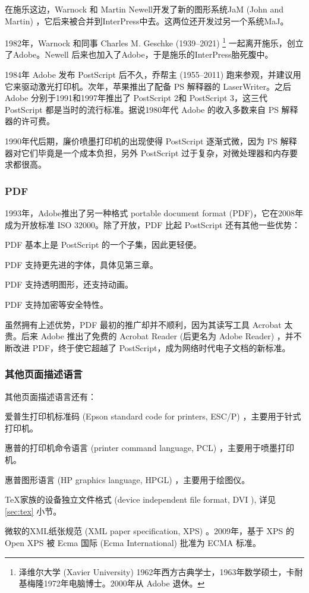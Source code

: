 在施乐这边，Warnock 和 Martin Newell\indexNewell 开发了新的图形系统JaM (John and Martin) ，它后来被合并到InterPress中去。这两位还开发过另一个系统MaJ。

1982年，Warnock 和同事 Charles M. Geschke (1939--2021)\indexGeschke{} \footnote{泽维尔大学 (Xavier University) 1962年西方古典学士，1963年数学硕士，卡耐基梅隆1972年电脑博士。2000年从 Adobe 退休。} 一起离开施乐，创立了Adobe\indexAdobe{}。Newell 后来也加入了Adobe，于是施乐的InterPress胎死腹中。

1984年 Adobe 发布 PostScript 后不久，乔帮主 (1955--2011)\indexJobs{} 跑来参观，并建议用它来驱动激光打印机。次年，苹果推出了配备 PS 解释器的 LaserWriter。之后 Adobe 分别于1991和1997年推出了 PostScript 2和 PostScript 3，这三代 PostScript 都是当时的流行标准。据说1980年代 Adobe 的收入多数来自 PS 解释器的许可费。

1990年代后期，廉价喷墨打印机的出现使得 PostScript 逐渐式微，因为 PS 解释器对它们毕竟是一个成本负担，另外 PostScript 过于复杂，对微处理器和内存要求都很高。

\subsubsection{PDF}
1993年，Adobe推出了另一种格式 portable document format (PDF)，它在2008年成为开放标准 ISO\indexISO{} 32000。除了开放，PDF 比起 PostScript 还有其他一些优势：

\begin{compactitem}
  \item PDF 基本上是 PostScript 的一个子集，因此更轻便。
  \item PDF 支持更先进的字体，具体见第三章。
  \item PDF 支持透明图形，还支持动画。
  \item PDF 支持加密等安全特性。
\end{compactitem}

虽然拥有上述优势，PDF 最初的推广却并不顺利，因为其读写工具 Acrobat 太贵。后来 Adobe 推出了免费的 Acrobat Reader (后更名为 Adobe Reader) ，并不断改进 PDF，终于使它超越了 PostScript，成为网络时代电子文档的新标准。

\subsubsection{其他页面描述语言}

其他页面描述语言还有：
\begin{compactitem}
   \item 爱普生\indexEpson{}打印机标准码 (Epson standard code for printers, ESC/P) ，主要用于针式打印机。
   \item 惠普\indexHP{}的打印机命令语言 (printer command language, PCL) ，主要用于喷墨打印机。
   \item 惠普图形语言 (HP graphics language, HPGL) ，主要用于绘图仪。
   \item \TeX 家族的设备独立文件格式 (device independent file format,  DVI ), 详见 \ref{sec:tex} 小节。
   \item 微软\indexMSFT 的XML纸张规范 (XML paper specification, XPS) 。2009年，基于 XPS 的 Open XPS 被 Ecma 国际 (Ecma International)\indexECMA{} 批准为 ECMA 标准。
\end{compactitem}

